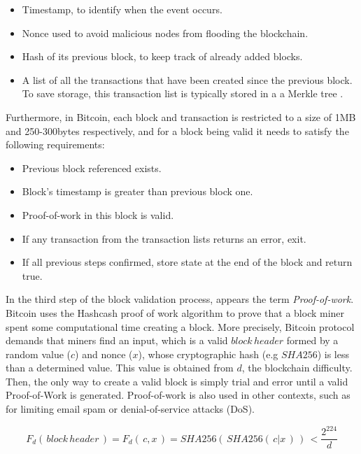 \begin{itemize}
	
	\item Timestamp, to identify when the event occurs.
	\item Nonce used to avoid malicious nodes from flooding the blockchain.
	\item Hash of its previous block, to keep track of already added blocks. 
	\item A list of all the transactions that have been created since the previous block. To save storage, this transaction list is typically stored in a a Merkle tree \citep{merkle1987digital}.
\end{itemize}

Furthermore, in Bitcoin, each block and transaction is restricted to a size of 1MB and 250-300bytes respectively, and for a block being valid it needs to satisfy the following requirements:

\begin{itemize}
	
	\item Previous block referenced exists.
	\item Block's timestamp is greater than previous block one.
	\item Proof-of-work in this block is valid.
	\item If any transaction from the transaction lists returns an error, exit.
	\item If all previous steps confirmed, store state at the end of the block and return true.
\end{itemize}  

In the third step of the block validation process, appears the term \textit{Proof-of-work}. Bitcoin uses the Hashcash proof of work algorithm to prove that a block miner spent some computational time creating a block. More precisely, Bitcoin protocol demands that miners find an input, which is a valid $block \, header$ formed by a random value ($c$) and nonce ($x$), whose cryptographic hash (e.g $SHA256$) is less than a determined value. This value is obtained from $d$, the blockchain difficulty. Then, the only way to create a valid block is simply trial and error until a valid Proof-of-Work is generated. Proof-of-work is also used in other contexts, such as for limiting email spam or denial-of-service attacks (DoS).

$$ F_d( \, block \, header \,) = F_d( \,c,x \,) = SHA256( \, SHA256( \, c|x \,) \,)\, < \frac{2^{224}}{d}$$


